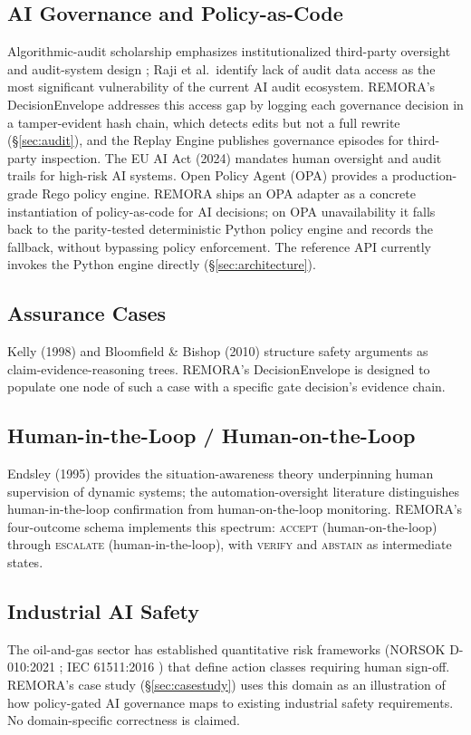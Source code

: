 \documentclass[10pt,twocolumn]{article}
\begin{document}
\subsection{AI Governance and Policy-as-Code}
Algorithmic-audit scholarship emphasizes institutionalized third-party
oversight and audit-system design \cite{raji2022outsider}; Raji et al.\
identify lack of audit data access as the most significant vulnerability
of the current AI audit ecosystem. REMORA's DecisionEnvelope addresses
this access gap by logging each governance decision in a tamper-evident hash
chain, which detects edits but not a full rewrite (\S\ref{sec:audit}), and the Replay Engine publishes governance episodes for
third-party inspection. The EU AI Act (2024) \cite{euaiact2024} mandates human oversight and
audit trails for high-risk AI systems. Open Policy Agent (OPA)
\cite{opa} provides a production-grade Rego policy engine. REMORA
ships an OPA adapter as a concrete instantiation of policy-as-code for
AI decisions; on OPA unavailability it falls back to the parity-tested
deterministic Python policy engine and records the fallback, without
bypassing policy enforcement. The reference
API currently invokes the Python engine directly (\S\ref{sec:architecture}).

\subsection{Assurance Cases}
Kelly (1998) \cite{kelly1998goal} and Bloomfield \& Bishop (2010)
\cite{bloomfield2010safety} structure safety arguments as
claim-evidence-reasoning trees. REMORA's DecisionEnvelope is designed
to populate one node of such a case with a specific gate decision's
evidence chain.

\subsection{Human-in-the-Loop / Human-on-the-Loop}
Endsley (1995) \cite{endsley1995toward} provides the
situation-awareness theory underpinning human supervision of dynamic
systems; the automation-oversight literature distinguishes
human-in-the-loop confirmation from human-on-the-loop monitoring.
REMORA's four-outcome schema implements this
spectrum: \textsc{accept} (human-on-the-loop) through
\textsc{escalate} (human-in-the-loop), with \textsc{verify} and
\textsc{abstain} as intermediate states.

\subsection{Industrial AI Safety}
The oil-and-gas sector has established quantitative risk frameworks
(NORSOK D-010:2021 \cite{norsok2021d010}; IEC 61511:2016 \cite{iec61511})
that define action classes requiring human sign-off. REMORA's case study
(\S\ref{sec:casestudy}) uses this domain as an illustration of how
policy-gated AI governance maps to existing industrial safety
requirements. No domain-specific correctness is claimed.
\end{document}
